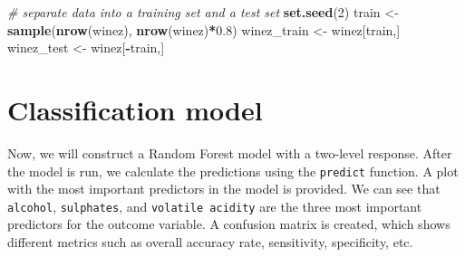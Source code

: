 \documentclass[
]{book}
\newenvironment{Shaded}{\begin{snugshade}}{\end{snugshade}}
\newcommand{\CommentTok}[1]{\textcolor[rgb]{0.56,0.35,0.01}{\textit{#1}}}
\newcommand{\DecValTok}[1]{\textcolor[rgb]{0.00,0.00,0.81}{#1}}
\newcommand{\FloatTok}[1]{\textcolor[rgb]{0.00,0.00,0.81}{#1}}
\newcommand{\FunctionTok}[1]{\textcolor[rgb]{0.13,0.29,0.53}{\textbf{#1}}}
\newcommand{\NormalTok}[1]{#1}
\newcommand{\OtherTok}[1]{\textcolor[rgb]{0.56,0.35,0.01}{#1}}
\newcommand{\SpecialCharTok}[1]{\textcolor[rgb]{0.81,0.36,0.00}{\textbf{#1}}}
\begin{document}
\begin{Shaded}
\begin{Highlighting}[]
\CommentTok{\# separate data into a training set and a test set }
\FunctionTok{set.seed}\NormalTok{(}\DecValTok{2}\NormalTok{)}
\NormalTok{train }\OtherTok{\textless{}{-}} \FunctionTok{sample}\NormalTok{(}\FunctionTok{nrow}\NormalTok{(winez), }\FunctionTok{nrow}\NormalTok{(winez)}\SpecialCharTok{*}\FloatTok{0.8}\NormalTok{)}
\NormalTok{winez\_train }\OtherTok{\textless{}{-}}\NormalTok{ winez[train,]}
\NormalTok{winez\_test }\OtherTok{\textless{}{-}}\NormalTok{ winez[}\SpecialCharTok{{-}}\NormalTok{train,]}
\end{Highlighting}
\end{Shaded}

\hypertarget{classification-model}{%
\section{Classification model}\label{classification-model}}

Now, we will construct a Random Forest model with a two-level response. After the model is run, we calculate the predictions using the \texttt{predict} function. A plot with the most important predictors in the model is provided. We can see that \texttt{alcohol}, \texttt{sulphates}, and \texttt{volatile\ acidity} are the three most important predictors for the outcome variable. A confusion matrix is created, which shows different metrics such as overall accuracy rate, sensitivity, specificity, etc.
\end{document}
